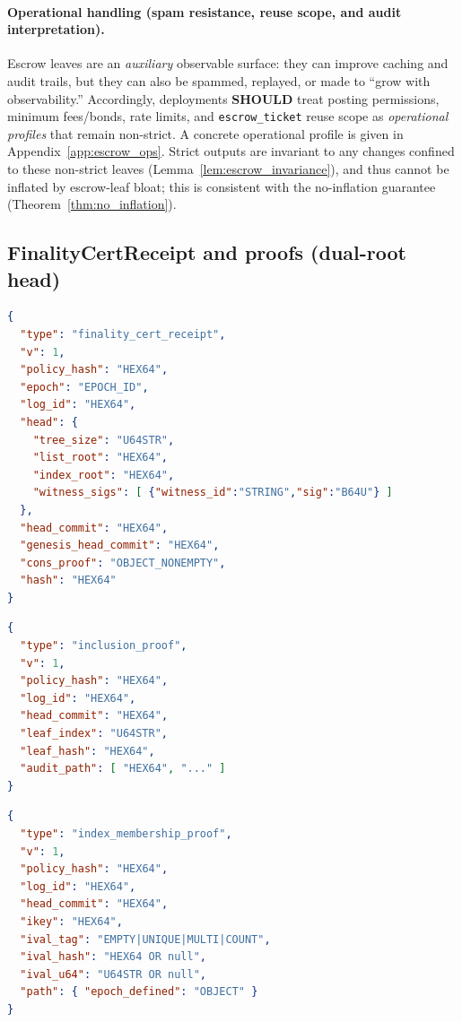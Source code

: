 \documentclass[11pt]{article}
\newcommand{\SHOULD}{\textbf{SHOULD}}
\newcommand{\code}[1]{\texttt{#1}}
\newcommand{\1}{\mathbf{1}}
\theoremstyle{definition}
\theoremstyle{plain}
\begin{document}
\paragraph{Operational handling (spam resistance, reuse scope, and audit interpretation).}
Escrow leaves are an \emph{auxiliary} observable surface: they can improve caching and audit trails, but they can also be spammed, replayed, or made to ``grow with observability.''
Accordingly, deployments \SHOULD{} treat posting permissions, minimum fees/bonds, rate limits, and \code{escrow\_ticket} reuse scope as \emph{operational profiles} that remain non-strict.
A concrete operational profile is given in Appendix~\ref{app:escrow_ops}.
Strict outputs are invariant to any changes confined to these non-strict leaves (Lemma~\ref{lem:escrow_invariance}), and thus cannot be inflated by escrow-leaf bloat; this is consistent with the no-inflation guarantee (Theorem~\ref{thm:no_inflation}).

\subsection{FinalityCertReceipt and proofs (dual-root head)}


\begin{lstlisting}[language=json,caption={FinalityCertReceipt (strict-grade; witness-cosigned head; consistency proof REQUIRED for strict).}]
{
  "type": "finality_cert_receipt",
  "v": 1,
  "policy_hash": "HEX64",
  "epoch": "EPOCH_ID",
  "log_id": "HEX64",
  "head": {
    "tree_size": "U64STR",
    "list_root": "HEX64",
    "index_root": "HEX64",
    "witness_sigs": [ {"witness_id":"STRING","sig":"B64U"} ]
  },
  "head_commit": "HEX64",
  "genesis_head_commit": "HEX64",
  "cons_proof": "OBJECT_NONEMPTY",
  "hash": "HEX64"
}
\end{lstlisting}

\begin{lstlisting}[language=json,caption={InclusionProof (list-root membership; leaf\_hash recomputable from receipt).}]
{
  "type": "inclusion_proof",
  "v": 1,
  "policy_hash": "HEX64",
  "log_id": "HEX64",
  "head_commit": "HEX64",
  "leaf_index": "U64STR",
  "leaf_hash": "HEX64",
  "audit_path": [ "HEX64", "..." ]
}
\end{lstlisting}

\begin{lstlisting}[language=json,caption={IndexMembershipProof (index-root membership for uniqueness and aggregates).}]
{
  "type": "index_membership_proof",
  "v": 1,
  "policy_hash": "HEX64",
  "log_id": "HEX64",
  "head_commit": "HEX64",
  "ikey": "HEX64",
  "ival_tag": "EMPTY|UNIQUE|MULTI|COUNT",
  "ival_hash": "HEX64 OR null",
  "ival_u64": "U64STR OR null",
  "path": { "epoch_defined": "OBJECT" }
}
\end{lstlisting}
\end{document}
